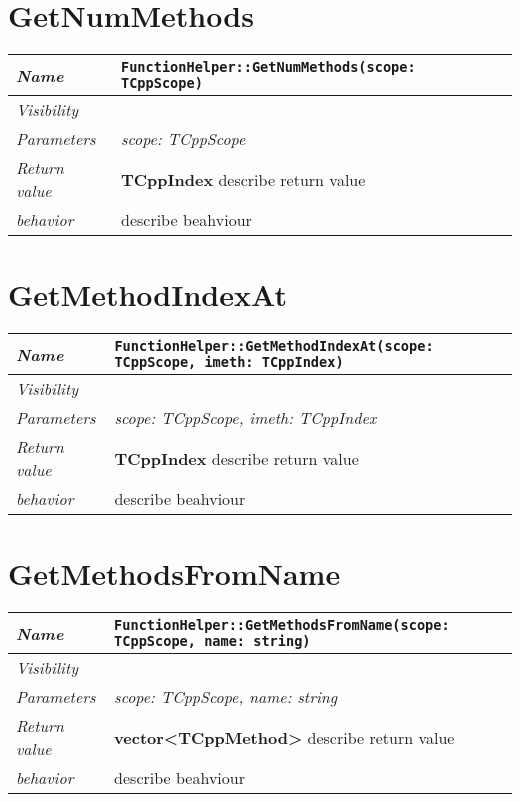  \section{GetNumMethods}
\begin{longtable}{p{3cm} @{\hskip 1cm} p{12cm}}
 \hline
\textit{Name} & \texttt{FunctionHelper::GetNumMethods(scope: TCppScope)}\\
\hline
 \textit{Visibility} & \\
\hline
\textit{Parameters} & \textit{scope: TCppScope}\\
\hline
\textit{Return value} & \textbf{ TCppIndex} describe return value\\
  \hline
 \textit{behavior} & describe beahviour \\
\hline
\end{longtable} \pagebreak
 \section{GetMethodIndexAt}
\begin{longtable}{p{3cm} @{\hskip 1cm} p{12cm}}
 \hline
\textit{Name} & \texttt{FunctionHelper::GetMethodIndexAt(scope: TCppScope, imeth: TCppIndex)}\\
\hline
 \textit{Visibility} & \\
\hline
\textit{Parameters} & \textit{scope: TCppScope, imeth: TCppIndex}\\
\hline
\textit{Return value} & \textbf{ TCppIndex} describe return value\\
  \hline
 \textit{behavior} & describe beahviour \\
\hline
\end{longtable} \pagebreak
 \section{GetMethodsFromName}
\begin{longtable}{p{3cm} @{\hskip 1cm} p{12cm}}
 \hline
\textit{Name} & \texttt{FunctionHelper::GetMethodsFromName(scope: TCppScope, name: string)}\\
\hline
 \textit{Visibility} & \\
\hline
\textit{Parameters} & \textit{scope: TCppScope, name: string}\\
\hline
\textit{Return value} & \textbf{ vector<TCppMethod>} describe return value\\
  \hline
 \textit{behavior} & describe beahviour \\
\hline
\end{longtable} \pagebreak
